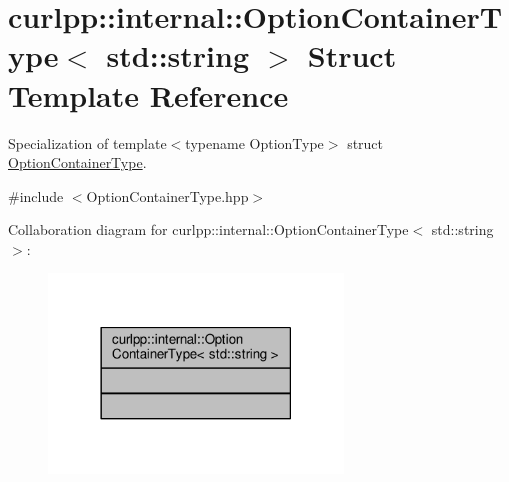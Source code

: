 \hypertarget{structcurlpp_1_1internal_1_1OptionContainerType_3_01std_1_1string_01_4}{\section{curlpp\-:\-:internal\-:\-:Option\-Container\-Type$<$ std\-:\-:string $>$ Struct Template Reference}
\label{structcurlpp_1_1internal_1_1OptionContainerType_3_01std_1_1string_01_4}
}


Specialization of template$<$typename Option\-Type$>$ struct \hyperlink{structcurlpp_1_1internal_1_1OptionContainerType}{Option\-Container\-Type}.  




{\ttfamily \#include $<$Option\-Container\-Type.\-hpp$>$}



Collaboration diagram for curlpp\-:\-:internal\-:\-:Option\-Container\-Type$<$ std\-:\-:string $>$\-:\nopagebreak
\begin{figure}[H]
\begin{center}
\leavevmode
\includegraphics[width=222pt]{structcurlpp_1_1internal_1_1OptionContainerType_3_01std_1_1string_01_4__coll__graph}
\end{center}
\end{figure}
